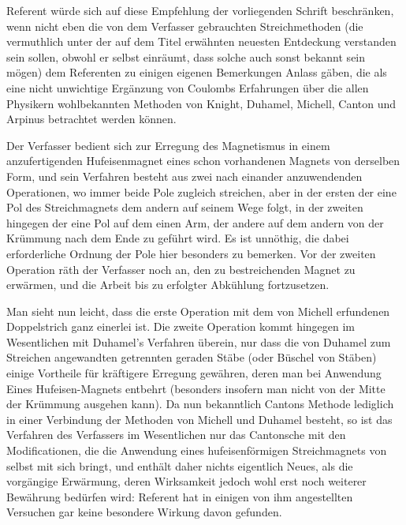 \documentclass[fontsize=10pt,paper=a5,pagesize=auto]{scrbook}
\newcommand{\origpage}[1]{\marginpar{\footnotesize\textit{S. #1}}}
\begin{document}
Referent würde sich auf diese Empfehlung der vorliegenden Schrift beschränken, wenn nicht eben die von dem Verfasser gebrauchten Streichmethoden (die vermuthlich unter der auf dem Titel erwähnten neuesten Entdeckung verstanden sein sollen, obwohl er selbst einräumt, dass solche auch sonst bekannt sein mögen) dem Referenten zu einigen eigenen Bemerkungen Anlass gäben, die als eine nicht unwichtige Ergänzung von Coulombs Erfahrungen über die allen Physikern wohlbekannten Methoden von Knight, Duhamel, Michell, Canton und Arpinus betrachtet werden können.

\origpage{593}
Der Verfasser bedient sich zur Erregung des Magnetismus in einem anzufertigenden Hufeisenmagnet eines schon vorhandenen Magnets von derselben Form, und sein Verfahren besteht aus zwei nach einander anzuwendenden Operationen, wo immer beide Pole zugleich streichen, aber in der ersten der eine Pol des Streichmagnets dem andern auf seinem Wege folgt, in der zweiten hingegen der eine Pol auf dem einen Arm, der andere auf dem andern von der Krümmung nach dem Ende zu geführt wird. Es ist unnöthig, die dabei erforderliche Ordnung der Pole hier besonders zu bemerken. Vor der zweiten Operation räth der Verfasser noch an, den zu bestreichenden Magnet zu erwärmen, und die Arbeit bis zu erfolgter Abkühlung fortzusetzen.

Man sieht nun leicht, dass die erste Operation mit dem von Michell erfundenen Doppelstrich ganz einerlei ist. Die zweite Operation kommt hingegen im Wesentlichen mit Duhamel's Verfahren überein, nur dass die von Duhamel zum Streichen angewandten getrennten geraden Stäbe (oder Büschel von Stäben) einige Vortheile für kräftigere Erregung gewähren, deren man bei Anwendung Eines Hufeisen-Magnets entbehrt (besonders insofern man nicht von der Mitte der Krümmung ausgehen kann). Da nun bekanntlich Cantons Methode lediglich in einer Verbindung der Methoden von Michell und Duhamel besteht, so ist das Verfahren des Verfassers im Wesentlichen nur das Cantonsche mit den Modificationen, die die Anwendung eines hufeisenförmigen Streichmagnets von selbst mit sich bringt, und enthält daher nichts eigentlich Neues, als die vorgängige Erwärmung, deren Wirksamkeit jedoch wohl erst noch weiterer Bewährung bedürfen wird: Referent hat in einigen von ihm angestellten Versuchen gar keine besondere Wirkung davon gefunden.
\end{document}
